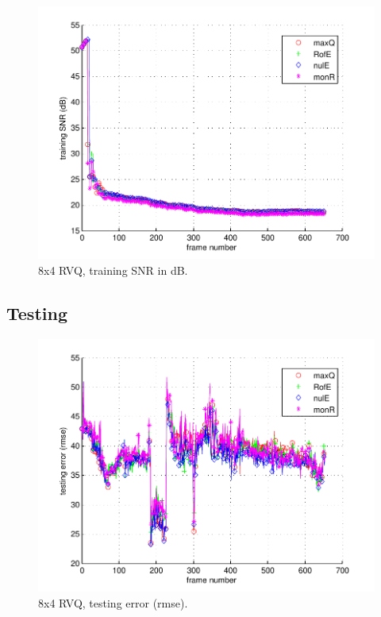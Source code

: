 								\begin{figure}[h!]
								\centering
								\includegraphics[height=0.4\textheight]{thesis/6_car4_8_4_1000_trg_SNRdB.pdf}
								\caption{8x4 RVQ, training SNR in dB.}
								\label{fig:6_car4_8_4_1000_trg_SNRdB}
								\end{figure}
\clearpage
\newpage
\subsection{Testing}
								\begin{figure}[h!]
								\centering
								\includegraphics[height=0.4\textheight]{thesis/6_car4_8_4_1000_tst_rmse.pdf}
								\caption{8x4 RVQ, testing error (rmse).}
								\label{fig:6_car4_8_4_1000_tst_rmse}
								\end{figure}


